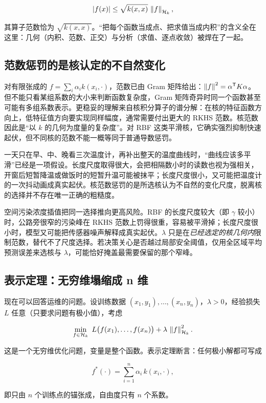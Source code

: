 \[
\left|f(x)\right|\le\sqrt{k(x,x)}\,\left\lVert f\right\rVert_{\mathcal{H}_k},
\]

其算子范数恰为 \(\sqrt{k(x,x)}\)。``把每个函数当成点、把求值当成内积''的含义全在这里：几何（内积、范数、正交）与分析（求值、逐点收敛）被焊在了一起。

\subsection{范数惩罚的是核认定的不自然变化}

对有限张成的 \(f=\sum_i\alpha_i k(x_i,\cdot)\)，范数已由 Gram 矩阵给出：\(\left\lVert f\right\rVert^{2}=\alpha^{\mathsf{T}}K\alpha\)。但不能只看某组系数的大小来判断函数复杂度，Gram 矩阵奇异时同一个函数甚至可能有多组系数表示。更稳妥的理解来自核积分算子的谱分解：在核的特征函数方向上，低特征值方向要实现同样幅度，通常需要付出更大的 RKHS 范数。核范数因此是``以 \(k\) 的几何为度量的复杂度''。对 RBF 这类平滑核，它确实强烈抑制快速起伏，但不同核的范数不能一概等同于普通导数惩罚。

一天只在早、中、晚看三次温度计，再补出整天的温度曲线时，``曲线应该多平滑''已经是一项假设。长度尺度取得很大，会把相隔数小时的读数也视为强相关，开窗后短暂降温或做饭时的短暂升温可能被抹平；长度尺度很小，又可能把温度计的一次抖动画成真实起伏。核范数惩罚的是所选核认为不自然的变化尺度，脱离核的选择并不存在唯一正确的粗糙度。

空间污染浓度插值把同一选择推向更高风险。RBF 的长度尺度较大（即 \(\gamma\) 较小）时，公路旁很窄的污染峰在 RKHS 范数上罚得很重，容易被平滑掉；长度尺度很小时，模型又可能把传感器噪声解释成真实起伏。\(\lambda\) 只是在\emph{已经选定的核几何内}限制范数，替代不了尺度选择。若决策关心是否越过局部安全阈值，仅用全区域平均预测误差来选核与 \(\lambda\)，可能恰好掩盖最需要保留的那个窄峰。

\subsection{表示定理：无穷维塌缩成 n 维}

现在可以回答运维的问题。设训练数据 \((x_1,y_1),\dots,(x_n,y_n)\)，\(\lambda>0\)，经验损失 \(L\) 任意（只要求问题有极小值），考虑

\[
\min_{f\in\mathcal{H}_k}\
L\bigl(f(x_1),\dots,f(x_n)\bigr)
+\lambda\,\left\lVert f\right\rVert_{\mathcal{H}_k}^{2}.
\]

这是一个无穷维优化问题，变量是整个函数。表示定理断言：任何极小解都可写成

\[
f^{*}(\cdot)=\sum_{i=1}^{n}\alpha_i\,k(x_i,\cdot),
\]

即只由 \(n\) 个训练点的锚张成，自由度只有 \(n\) 个系数。

